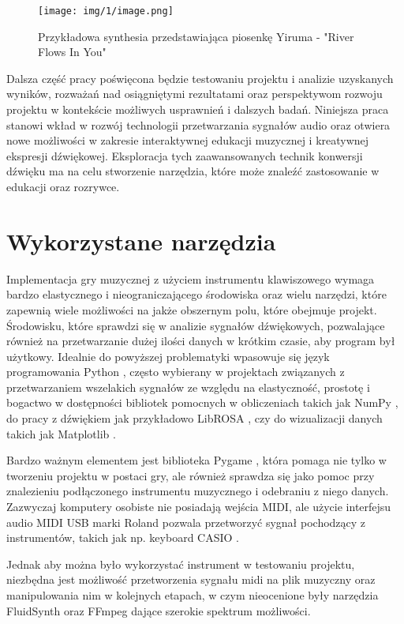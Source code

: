 \begin{figure}[h]
  \centering
  \texttt{[image: img/1/image.png]}
  \caption{Przykładowa synthesia przedstawiająca piosenkę Yiruma - "River Flows In You"\cite{synthesia}}
\end{figure}

Dalsza część pracy poświęcona będzie testowaniu projektu i analizie uzyskanych wyników, rozważań nad osiągniętymi rezultatami oraz perspektywom rozwoju projektu w kontekście możliwych usprawnień i dalszych badań. Niniejsza praca stanowi wkład w rozwój technologii przetwarzania sygnałów audio oraz otwiera nowe możliwości w zakresie interaktywnej edukacji muzycznej i kreatywnej ekspresji dźwiękowej. Eksploracja tych zaawansowanych technik konwersji dźwięku ma na celu stworzenie narzędzia, które może znaleźć zastosowanie w edukacji oraz rozrywce.
\newpage
\section{Wykorzystane narzędzia}

Implementacja gry muzycznej z użyciem instrumentu klawiszowego wymaga bardzo elastycznego i nieograniczającego środowiska oraz wielu narzędzi, które zapewnią wiele możliwości na jakże obszernym polu, które obejmuje projekt. Środowisku, które sprawdzi się w analizie sygnałów dźwiękowych, pozwalające również na przetwarzanie dużej ilości danych w krótkim czasie, aby program był użytkowy. Idealnie do powyższej problematyki wpasowuje się język programowania {Python} \cite{python}, często wybierany w projektach związanych z przetwarzaniem wszelakich sygnałów ze względu na elastyczność, prostotę i bogactwo w dostępności bibliotek pomocnych w obliczeniach takich jak {NumPy} \cite{numpy}, do pracy z dźwiękiem jak przykładowo {LibROSA} \cite{librosa}, czy do wizualizacji danych takich jak {Matplotlib} \cite{matplotlib}.

Bardzo ważnym elementem jest biblioteka {Pygame} \cite{pygame}, która pomaga nie tylko w tworzeniu projektu w postaci gry, ale również sprawdza się jako pomoc przy znalezieniu podłączonego instrumentu muzycznego i odebraniu z niego danych. Zazwyczaj komputery osobiste nie posiadają wejścia MIDI, ale użycie interfejsu audio MIDI USB \cite{roland_um_one} marki Roland pozwala przetworzyć sygnał pochodzący z instrumentów, takich jak np. keyboard CASIO \cite{casio_ctk496}.

Jednak aby można było wykorzystać instrument w testowaniu projektu, niezbędna jest możliwość przetworzenia sygnału midi na plik muzyczny oraz manipulowania nim w kolejnych etapach, w czym nieocenione były narzędzia {FluidSynth} \cite{fluidsynth} oraz {FFmpeg} \cite{ffmpeg} dające szerokie spektrum możliwości.

